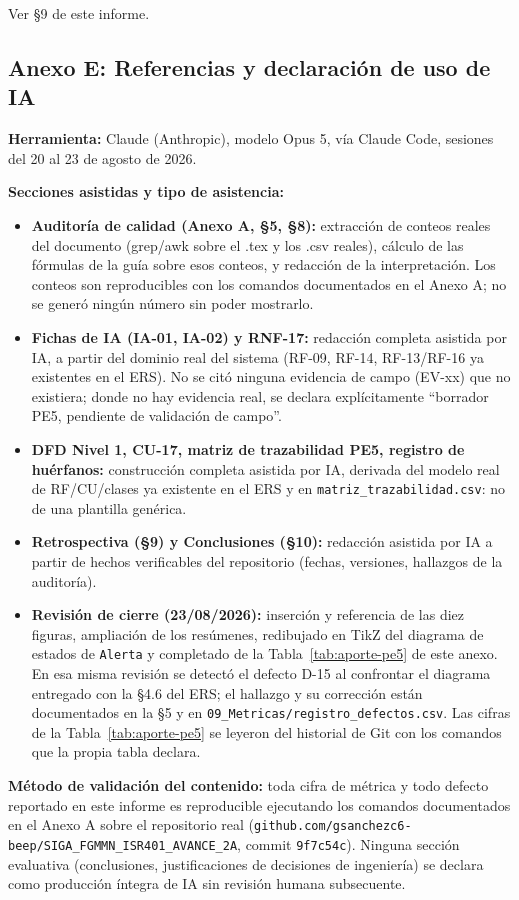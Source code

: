 Ver \S9 de este informe.

\subsection*{Anexo E: Referencias y declaraci\'on de uso de IA}

\textbf{Herramienta:} Claude (Anthropic), modelo Opus 5, v\'ia Claude Code, sesiones del 20 al 23 de agosto de 2026.

\textbf{Secciones asistidas y tipo de asistencia:}
\begin{itemize}[nosep]
\item \textbf{Auditor\'ia de calidad (Anexo A, \S5, \S8):} extracci\'on de conteos reales del documento (grep/awk sobre el .tex y los .csv reales), c\'alculo de las f\'ormulas de la gu\'ia sobre esos conteos, y redacci\'on de la interpretaci\'on. Los conteos son reproducibles con los comandos documentados en el Anexo A; no se gener\'o ning\'un n\'umero sin poder mostrarlo.
\item \textbf{Fichas de IA (IA-01, IA-02) y RNF-17:} redacci\'on completa asistida por IA, a partir del dominio real del sistema (RF-09, RF-14, RF-13/RF-16 ya existentes en el ERS). No se cit\'o ninguna evidencia de campo (EV-xx) que no existiera; donde no hay evidencia real, se declara expl\'icitamente ``borrador PE5, pendiente de validaci\'on de campo''.
\item \textbf{DFD Nivel 1, CU-17, matriz de trazabilidad PE5, registro de hu\'erfanos:} construcci\'on completa asistida por IA, derivada del modelo real de RF/CU/clases ya existente en el ERS y en \texttt{matriz\_trazabilidad.csv}: no de una plantilla gen\'erica.
\item \textbf{Retrospectiva (\S9) y Conclusiones (\S10):} redacci\'on asistida por IA a partir de hechos verificables del repositorio (fechas, versiones, hallazgos de la auditor\'ia).
\item \textbf{Revisi\'on de cierre (23/08/2026):} inserci\'on y referencia de las diez figuras, ampliaci\'on de los res\'umenes, redibujado en TikZ del diagrama de estados de \texttt{Alerta} y completado de la Tabla~\ref{tab:aporte-pe5} de este anexo. En esa misma revisi\'on se detect\'o el defecto D-15 al confrontar el diagrama entregado con la \S4.6 del ERS; el hallazgo y su correcci\'on est\'an documentados en la \S5 y en \texttt{09\_Metricas/registro\_defectos.csv}. Las cifras de la Tabla~\ref{tab:aporte-pe5} se leyeron del historial de Git con los comandos que la propia tabla declara.
\end{itemize}

\textbf{M\'etodo de validaci\'on del contenido:} toda cifra de m\'etrica y todo defecto reportado en este informe es reproducible ejecutando los comandos documentados en el Anexo A sobre el repositorio real (\texttt{github.com/gsanchezc6-beep/SIGA\_FGMMN\_ISR401\_AVANCE\_2A}, commit \texttt{9f7c54c}). Ninguna secci\'on evaluativa (conclusiones, justificaciones de decisiones de ingenier\'ia) se declara como producci\'on \'integra de IA sin revisi\'on humana subsecuente.
